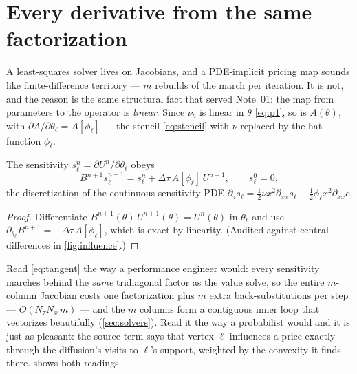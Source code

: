 \documentclass[11pt]{article}
\begin{document}
\section{Every derivative from the same factorization}
\label{sec:sens}

A least-squares solver lives on Jacobians, and a PDE-implicit pricing map
sounds like finite-difference territory --- $m$ rebuilds of the march per
iteration.  It is not, and the reason is the same structural fact that
served Note~01: the map from parameters to the operator is \emph{linear}.
Since $\nu_\theta$ is linear in $\theta$ \eqref{eq:p1}, so is $A(\theta)$,
with $\partial A/\partial\theta_\ell=A[\phi_\ell]$ --- the stencil
\eqref{eq:stencil} with $\nu$ replaced by the hat function $\phi_\ell$.

\begin{proposition}
\label{prop:tangent}
The sensitivity $s^{n}_\ell=\partial U^{n}/\partial\theta_\ell$ obeys
\begin{equation}
B^{n+1}s^{n+1}_\ell=s^{n}_\ell+\Delta\tau\,A[\phi_\ell]\,U^{n+1},
\qquad s^{0}_\ell=0,
\label{eq:tangent}
\end{equation}
the discretization of the continuous sensitivity PDE
$\partial_\tau s_\ell=\tfrac12\nu x^{2}\partial_{xx}s_\ell
+\tfrac12\phi_\ell x^{2}\partial_{xx}c$.
\end{proposition}

\begin{proof}
Differentiate $B^{n+1}(\theta)\,U^{n+1}(\theta)=U^{n}(\theta)$ in
$\theta_\ell$ and use
$\partial_{\theta_\ell}B^{n+1}=-\Delta\tau\,A[\phi_\ell]$, which is exact
by linearity.  (Audited against central differences in
\cref{fig:influence}.)
\end{proof}

Read \eqref{eq:tangent} the way a performance engineer would: every
sensitivity marches behind the \emph{same} tridiagonal factor as the value
solve, so the entire $m$-column Jacobian costs one factorization plus $m$
extra back-substitutions per step --- $O(N_\tau N_x\,m)$ --- and the $m$
columns form a contiguous inner loop that vectorizes beautifully
(\cref{sec:solvers}).  Read it the way a probabilist would and it is just
as pleasant: the source term says that vertex $\ell$ influences a price
exactly through the diffusion's visits to $\ell$'s support, weighted by the
convexity it finds there.   shows both readings.
\end{document}
